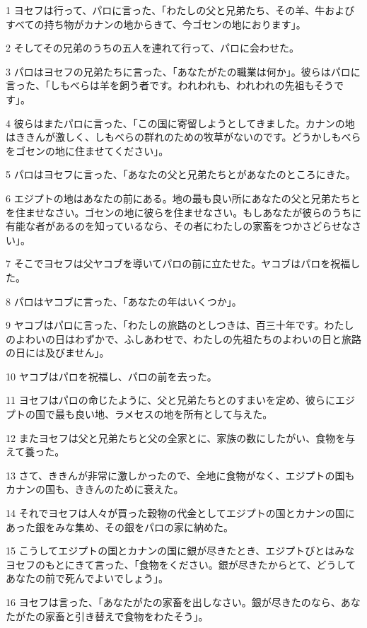 \par 1 ヨセフは行って、パロに言った、「わたしの父と兄弟たち、その羊、牛およびすべての持ち物がカナンの地からきて、今ゴセンの地におります」。
\par 2 そしてその兄弟のうちの五人を連れて行って、パロに会わせた。
\par 3 パロはヨセフの兄弟たちに言った、「あなたがたの職業は何か」。彼らはパロに言った、「しもべらは羊を飼う者です。われわれも、われわれの先祖もそうです」。
\par 4 彼らはまたパロに言った、「この国に寄留しようとしてきました。カナンの地はききんが激しく、しもべらの群れのための牧草がないのです。どうかしもべらをゴセンの地に住ませてください」。
\par 5 パロはヨセフに言った、「あなたの父と兄弟たちとがあなたのところにきた。
\par 6 エジプトの地はあなたの前にある。地の最も良い所にあなたの父と兄弟たちとを住ませなさい。ゴセンの地に彼らを住ませなさい。もしあなたが彼らのうちに有能な者があるのを知っているなら、その者にわたしの家畜をつかさどらせなさい」。
\par 7 そこでヨセフは父ヤコブを導いてパロの前に立たせた。ヤコブはパロを祝福した。
\par 8 パロはヤコブに言った、「あなたの年はいくつか」。
\par 9 ヤコブはパロに言った、「わたしの旅路のとしつきは、百三十年です。わたしのよわいの日はわずかで、ふしあわせで、わたしの先祖たちのよわいの日と旅路の日には及びません」。
\par 10 ヤコブはパロを祝福し、パロの前を去った。
\par 11 ヨセフはパロの命じたように、父と兄弟たちとのすまいを定め、彼らにエジプトの国で最も良い地、ラメセスの地を所有として与えた。
\par 12 またヨセフは父と兄弟たちと父の全家とに、家族の数にしたがい、食物を与えて養った。
\par 13 さて、ききんが非常に激しかったので、全地に食物がなく、エジプトの国もカナンの国も、ききんのために衰えた。
\par 14 それでヨセフは人々が買った穀物の代金としてエジプトの国とカナンの国にあった銀をみな集め、その銀をパロの家に納めた。
\par 15 こうしてエジプトの国とカナンの国に銀が尽きたとき、エジプトびとはみなヨセフのもとにきて言った、「食物をください。銀が尽きたからとて、どうしてあなたの前で死んでよいでしょう」。
\par 16 ヨセフは言った、「あなたがたの家畜を出しなさい。銀が尽きたのなら、あなたがたの家畜と引き替えで食物をわたそう」。
